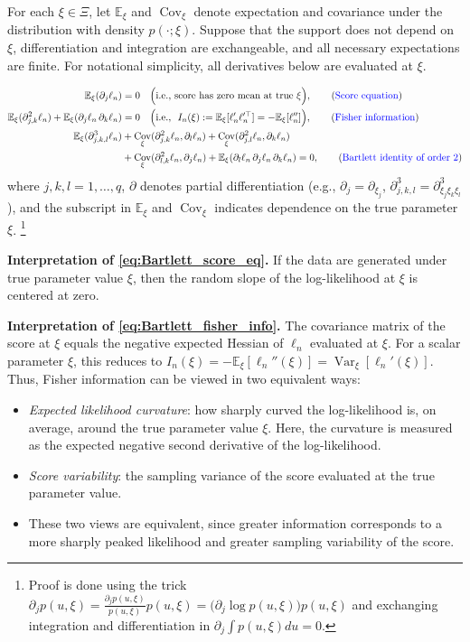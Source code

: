 \documentclass{article}
\newcommand{\blue}{\textcolor{blue}}
\newenvironment{mybox}{%
  \par\addvspace{10pt}%
  \begin{mdframed}[skipabove=0pt,skipbelow=10pt]%
}{%
  \end{mdframed}%
}
\theoremstyle{break}
\newcommand{\E}{\ensuremath{\mathbb{E}}}
\DeclareMathOperator{\Var}{Var}
\DeclareMathOperator{\Cov}{Cov}
\begin{document}
For each $\xi\in\Xi$, let $\E_\xi$ and $\Cov_\xi$ denote expectation and covariance under the distribution with density $p(\cdot;\xi)$. Suppose that the support does not depend on $\xi$, differentiation and integration are exchangeable, and all necessary expectations are finite. For notational simplicity, all derivatives below are evaluated at $\xi$.
\begin{mybox}
\begin{align}
\E_\xi(\partial_j \ell_n) &= 0
\quad\Big(\text{i.e., score has zero mean at true $\xi$}\Big), 
\tag{\blue{Score equation}}\label{eq:Bartlett_score_eq}\\
\E_\xi(\partial^2_{j,k} \ell_n) + \E_\xi(\partial_j \ell_n \, \partial_k \ell_n) &= 0
\quad\Big(\text{i.e., }\ I_n(\xi) := \E_\xi[\ell_n' \ell_n'^\top] = -\E_\xi[\ell_n'']\Big), 
\tag{\blue{Fisher information}} \label{eq:Bartlett_fisher_info}\\
\E_\xi(\partial^3_{j,k,l} \ell_n) 
&+ \Cov_{\xi}(\partial^2_{j,k} \ell_n, \partial_l \ell_n)
+ \Cov_{\xi}(\partial^2_{j,l} \ell_n, \partial_k \ell_n) \nonumber \\
&+ \Cov_{\xi}(\partial^2_{l,k} \ell_n, \partial_j \ell_n)
+ \E_\xi(\partial_l \ell_n \, \partial_j \ell_n \, \partial_k \ell_n) = 0,
\tag{\blue{Bartlett identity of order 2}} \label{eq:Bartlett_order2}
\end{align}
where $j, k, l = 1, \dots, q$, $\partial$ denotes partial differentiation (e.g., $\partial_j = \partial_{\xi_j}$, $\partial^3_{j,k,l} = \partial^3_{\xi_j \xi_k \xi_l}$), and the subscript in $\E_\xi$ and $\Cov_\xi$ indicates dependence on the true parameter $\xi$.
\footnote{Proof is done using the trick $\partial_j p(u, \xi) = \frac{\partial_j p(u, \xi) }{p(u, \xi)} p(u, \xi) = \Big(\partial_j \log p(u, \xi)\Big) p(u, \xi)$ and exchanging integration and differentiation in $\partial_j \int p(u, \xi) du = 0$.}
\end{mybox}

\textbf{Interpretation of \eqref{eq:Bartlett_score_eq}.} If the data are generated under true parameter value $\xi$, then the random slope of the log-likelihood at $\xi$ is centered at zero.


\textbf{Interpretation of \eqref{eq:Bartlett_fisher_info}.}
The covariance matrix of the score at $\xi$ equals the negative expected Hessian of $\ell_n$ evaluated at $\xi$. 
For a scalar parameter $\xi$, this reduces to $I_n(\xi) = -\E_\xi \left[\ell_n''(\xi)\right] = \Var_\xi \left[\ell_n'(\xi)\right]$.
Thus, Fisher information can be viewed in two equivalent ways:
\begin{itemize}
    \item \emph{Expected likelihood curvature}: how sharply curved the log-likelihood is, on average, around the true parameter value $\xi$. Here, the curvature is measured as the expected negative second derivative of the log-likelihood.
    \item \emph{Score variability}: the sampling variance of the score evaluated at the true parameter value.
    \item These two views are equivalent, since greater information corresponds to a more sharply peaked likelihood and greater sampling variability of the score.
\end{itemize}
\end{document}
